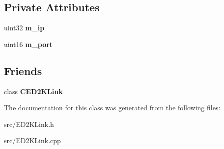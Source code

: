 \subsection*{Private Attributes}
\begin{DoxyCompactItemize}
\item 
uint32 {\bfseries m\_\-ip}\label{classCED2KServerLink_a4fb6ba0f0bb4484eb7c51c99869bce52}

\item 
uint16 {\bfseries m\_\-port}\label{classCED2KServerLink_a9830b5b401c1b973dcd151fc92ea0655}

\end{DoxyCompactItemize}
\subsection*{Friends}
\begin{DoxyCompactItemize}
\item 
class {\bf CED2KLink}\label{classCED2KServerLink_a279e7ff00da60d35d82d2fff0a8cba76}

\end{DoxyCompactItemize}


The documentation for this class was generated from the following files:\begin{DoxyCompactItemize}
\item 
src/ED2KLink.h\item 
src/ED2KLink.cpp\end{DoxyCompactItemize}
